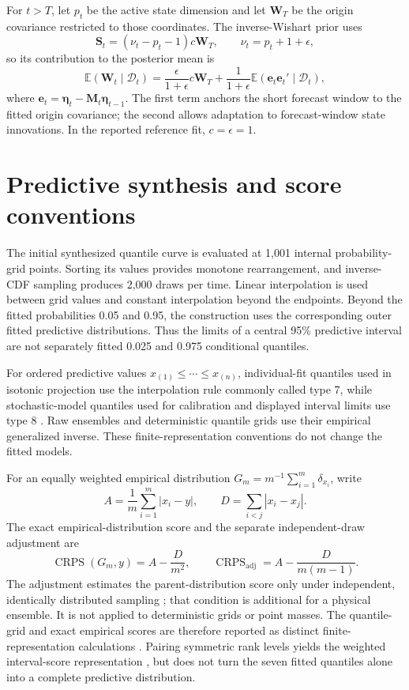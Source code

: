 For $t>T$, let $p_t$ be the active state dimension and let $\mathbf W_T$ be
the origin covariance restricted to those coordinates. The inverse-Wishart
prior uses
\[
\mathbf S_t=(\nu_t-p_t-1)c\mathbf W_T,
\qquad \nu_t=p_t+1+\epsilon,
\]
so its contribution to the posterior mean is
\[
\mathbb E(\mathbf W_t\mid\mathcal D_t)=
\frac{\epsilon}{1+\epsilon}c\mathbf W_T+
\frac{1}{1+\epsilon}
\mathbb E(\mathbf e_t\mathbf e_t'\mid\mathcal D_t),
\]
where
$\mathbf e_t=\boldsymbol\eta_t-\mathbf M_t\boldsymbol\eta_{t-1}$.
The first term anchors the short forecast window to the fitted origin
covariance; the second allows adaptation to forecast-window state
innovations. In the reported reference fit, $c=\epsilon=1$.

\section{Predictive synthesis and score conventions}
\label{env:app:numericalprediction}
\label{app:numericalprediction}

The initial synthesized quantile curve is evaluated at 1,001 internal
probability-grid points. Sorting its values provides monotone rearrangement,
and inverse-CDF sampling produces 2,000 draws per time. Linear interpolation
is used between grid values and constant interpolation beyond the endpoints.
Beyond the fitted probabilities 0.05 and 0.95, the construction uses the
corresponding outer fitted predictive distributions. Thus the limits of a
central 95\% predictive interval are not separately fitted 0.025 and 0.975
conditional quantiles.

For ordered predictive values $x_{(1)}\le\cdots\le x_{(n)}$, individual-fit
quantiles used in isotonic projection use the interpolation rule commonly
called type 7, while stochastic-model quantiles used for calibration and
displayed interval limits use type 8 \citep{env-hyndman1996sample}. Raw
ensembles and deterministic quantile grids use their empirical generalized
inverse. These finite-representation conventions do not change the fitted
models.

For an equally weighted empirical distribution
$G_m=m^{-1}\sum_{i=1}^m\delta_{x_i}$, write
\[
A=\frac1m\sum_{i=1}^m|x_i-y|,
\qquad D=\sum_{i<j}|x_i-x_j|.
\]
The exact empirical-distribution score and the separate independent-draw
adjustment are
\[
\operatorname{CRPS}(G_m,y)=A-\frac{D}{m^2},
\qquad
\operatorname{CRPS}_{\mathrm{adj}}=A-\frac{D}{m(m-1)}.
\]
The adjustment estimates the parent-distribution score only under independent,
identically distributed sampling \citep{env-ferro2014fair}; that condition is
additional for a physical ensemble. It is not applied to deterministic grids
or point masses. The quantile-grid and exact empirical scores are therefore
reported as distinct finite-representation calculations
\citep{env-zamo2018crps}. Pairing symmetric rank levels yields the weighted
interval-score representation \citep{env-bracher2021evaluating}, but does not
turn the seven fitted quantiles alone into a complete predictive distribution.

